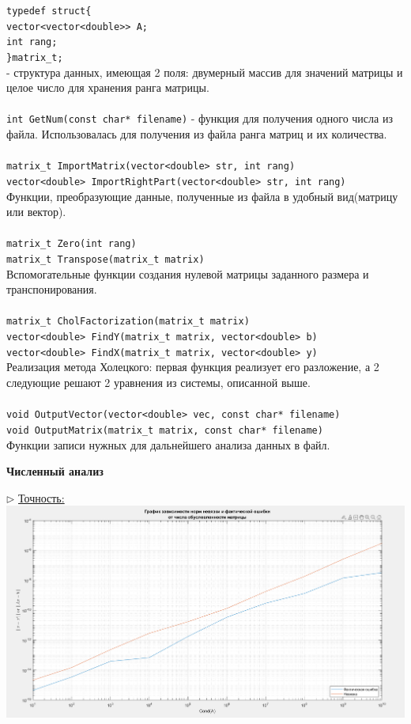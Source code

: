\documentclass{article}
\begin{document}
	\verb|typedef struct{|\\
	\hspace*{1cm} \verb|vector<vector<double>> A;|\\
	\hspace*{1cm} \verb|int rang;|\\
	\verb|}matrix_t;|\\
	- структура данных, имеющая 2 поля: двумерный массив для значений матрицы и целое число для хранения ранга матрицы.\\
	\\
	\verb|int GetNum(const char* filename)| - функция для получения одного числа из файла. Использовалась для получения из файла ранга матриц и их количества.\\
	\\
	\verb|matrix_t ImportMatrix(vector<double> str, int rang)|\\
	\verb|vector<double> ImportRightPart(vector<double> str, int rang)|\\ 
	Функции, преобразующие данные, полученные из файла в удобный вид(матрицу или вектор).\\
	\\
	\verb|matrix_t Zero(int rang)|\\
	\verb|matrix_t Transpose(matrix_t matrix)|\\
	Вспомогательные функции создания нулевой матрицы заданного размера и транспонирования.\\
	\\
	\verb|matrix_t CholFactorization(matrix_t matrix)|\\
	\verb|vector<double> FindY(matrix_t matrix, vector<double> b)|\\
	\verb|vector<double> FindX(matrix_t matrix, vector<double> y)|\\
	Реализация метода Холецкого: первая функция реализует его разложение, а 2 следующие решают 2 уравнения из системы, описанной выше.\\
	\\
	\verb|void OutputVector(vector<double> vec, const char* filename)|\\
	\verb|void OutputMatrix(matrix_t matrix, const char* filename)|\\
	Функции записи нужных для дальнейшего анализа данных в файл.
	\newpage
	\begin{center} \textbf{Численный анализ}\end{center}
	$\triangleright$ \underline{Точность:}\\
	\includegraphics[scale = 0.4]{Точность}\\
\end{document}
